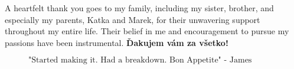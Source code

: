 A heartfelt thank you goes to my family, including my sister, brother, and especially my parents, Katka and Marek, for their unwavering support throughout my entire life. Their belief in me and encouragement to pursue my passions have been instrumental. \textbf{Ďakujem vám za všetko!}

\begin{figure}[b]
$$\mbox{"Started making it. Had a breakdown. Bon Appetite" - James Acaster}$$
\end{figure}


